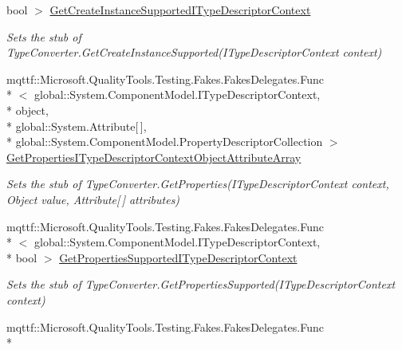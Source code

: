 \begin{DoxyCompactItemize}
bool $>$ \hyperlink{class_system_1_1_security_1_1_authentication_1_1_extended_protection_1_1_fakes_1_1_stub_extendedf67afed15bbc0df07bfc91316f6f81f0_a16acb2802acbc137c4c2cf2822f8645e}{Get\-Create\-Instance\-Supported\-I\-Type\-Descriptor\-Context}
\begin{DoxyCompactList}\small\item\em Sets the stub of Type\-Converter.\-Get\-Create\-Instance\-Supported(\-I\-Type\-Descriptor\-Context context)\end{DoxyCompactList}\item 
mqttf\-::\-Microsoft.\-Quality\-Tools.\-Testing.\-Fakes.\-Fakes\-Delegates.\-Func\\*
$<$ global\-::\-System.\-Component\-Model.\-I\-Type\-Descriptor\-Context, \\*
object, \\*
global\-::\-System.\-Attribute\mbox{[}$\,$\mbox{]}, \\*
global\-::\-System.\-Component\-Model.\-Property\-Descriptor\-Collection $>$ \hyperlink{class_system_1_1_security_1_1_authentication_1_1_extended_protection_1_1_fakes_1_1_stub_extendedf67afed15bbc0df07bfc91316f6f81f0_a0ca81ee37a4d0f1feeb974c1d8382543}{Get\-Properties\-I\-Type\-Descriptor\-Context\-Object\-Attribute\-Array}
\begin{DoxyCompactList}\small\item\em Sets the stub of Type\-Converter.\-Get\-Properties(\-I\-Type\-Descriptor\-Context context, Object value, Attribute\mbox{[}$\,$\mbox{]} attributes)\end{DoxyCompactList}\item 
mqttf\-::\-Microsoft.\-Quality\-Tools.\-Testing.\-Fakes.\-Fakes\-Delegates.\-Func\\*
$<$ global\-::\-System.\-Component\-Model.\-I\-Type\-Descriptor\-Context, \\*
bool $>$ \hyperlink{class_system_1_1_security_1_1_authentication_1_1_extended_protection_1_1_fakes_1_1_stub_extendedf67afed15bbc0df07bfc91316f6f81f0_abe0f92be220267e92b2228f8fc33ea56}{Get\-Properties\-Supported\-I\-Type\-Descriptor\-Context}
\begin{DoxyCompactList}\small\item\em Sets the stub of Type\-Converter.\-Get\-Properties\-Supported(\-I\-Type\-Descriptor\-Context context)\end{DoxyCompactList}\item 
mqttf\-::\-Microsoft.\-Quality\-Tools.\-Testing.\-Fakes.\-Fakes\-Delegates.\-Func\\*

\end{DoxyCompactItemize}
